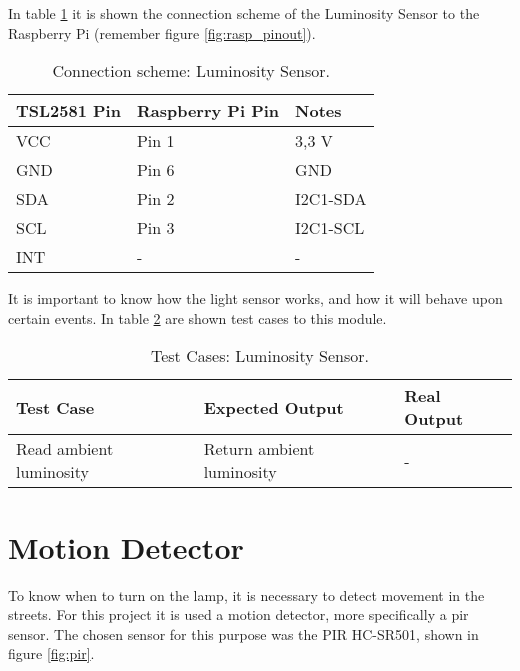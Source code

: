 In table \ref{table:connect_lightsensor} it is shown the connection scheme of the Luminosity Sensor to the Raspberry Pi (remember figure \ref{fig:rasp_pinout}).

\begin{table}[H]
	\centering
	\begin{tabular}{|m{5cm}|m{4cm}|m{3cm}|}
		\hline
		\textbf{TSL2581 Pin} & \textbf{Raspberry Pi Pin} & \textbf{Notes} 
		\\\hline\hline
		VCC & Pin 1 & 3,3 V
		\\\hline
		GND & Pin 6 & GND
		\\\hline
		SDA & Pin 2 & I2C1-SDA
		\\\hline
		SCL & Pin 3 & I2C1-SCL
		\\\hline
		INT & - & -
		\\\hline
	\end{tabular}
	
	\caption{Connection scheme: Luminosity Sensor.}
	\label{table:connect_lightsensor}
\end{table}

It is important to know how the light sensor works, and how it will behave upon certain events. In table \ref{table:test_light_sen} are shown test cases to this module.

\begin{table}[H]
	\centering
	\resizebox{\columnwidth}{!}
	{
		\begin{tabular}{|m{3cm}|m{5cm}||m{5cm}|}
			\hline
			\textbf{Test Case} & \textbf{Expected Output} & \textbf{Real Output}
			\\\hline\hline
			Read ambient luminosity & Return ambient luminosity  & -
			\\\hline
		\end{tabular}
	}
	\caption{Test Cases: Luminosity Sensor.}
	\label{table:test_light_sen}
\end{table}

\section{Motion Detector}
To know when to turn on the lamp, it is necessary to detect movement in the streets. For this project it is used a motion detector, more specifically a \ac{pir} sensor. The chosen sensor for this purpose was the PIR HC-SR501, shown in figure \ref{fig:pir}.  \cite{pir}


